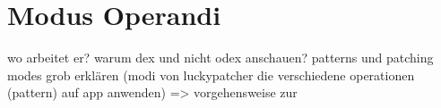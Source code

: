 \section{Modus Operandi}\label{section:luckypatcher-operation}
wo arbeitet er?\newline
warum dex und nicht odex anschauen?\newline
patterns und patching modes grob erklären (modi von luckypatcher die verschiedene operationen (pattern) auf app anwenden) => vorgehensweise zur
